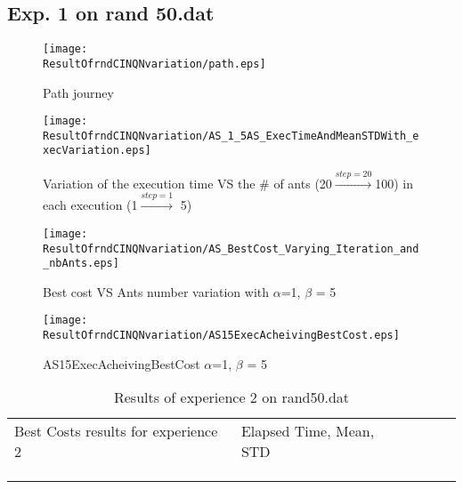 \subsection*{ \centering Exp. 1 on rand 50.dat }
\begin{figure}[H]
	\begin{minipage}[t]{0.5\linewidth}
		\texttt{[image: \\ResultOfrndCINQNvariation/path.eps]}
		\caption{Path journey}
		\label{fig:ResultOfrndCINQNvariation:path}
	\end{minipage}
	\hspace{2mm}
	\begin{minipage}[t]{0.5\linewidth}
	\texttt{[image: \\ResultOfrndCINQNvariation/AS\_1\_5AS\_ExecTimeAndMeanSTDWith\_execVariation.eps]}
	\caption{Variation of the execution time VS the \# of ants (20$\stackrel{step=20}{\rightarrow}$100) in each execution (1$\stackrel{step=1}{\rightarrow}$ 5)}
	\label{fig:ResultOfrndCINQNvariation:AS_1_5AS_ExecTimeAndMeanSTDWith_execVariation}
	\end{minipage}
\end{figure}
\begin{figure}[H]
		\begin{minipage}[t]{.5\linewidth}
		\texttt{[image: \\ResultOfrndCINQNvariation/AS\_BestCost\_Varying\_Iteration\_and\_nbAnts.eps]}
		\caption{Best cost VS Ants number variation with $\alpha$=1, $ \beta $ = 5}
		\label{fig:ResultOfrndCINQNvariation:AS_BestCost_Varying_Iteration_and_nbAnts}
		\end{minipage}
		\begin{minipage}[t]{.5\linewidth}
		\texttt{[image: \\ResultOfrndCINQNvariation/AS15ExecAcheivingBestCost.eps]}
		\caption{AS15ExecAcheivingBestCost $\alpha$=1, $ \beta $ = 5}
		\label{fig:ResultOfrndCINQNvariation:AS15ExecAcheivingBestCost}
		\end{minipage}
\end{figure}
		\begin{minipage}[t]{0.9\linewidth}
		\vspace{-9mm}
		\begin{table}[H]
		\label{tab:ResultOfrndCINQNvariation:expdeux}
		\begin{tabular}{lllll}
		\cline{1-2}
		\multicolumn{1}{|l|}{Best Costs results for experience 2}                                                           &  \multicolumn{1}{l|}{Elapsed Time, Mean, STD}                                             &  &  &  \\ \cline{1-2}
		\multicolumn{1}{|l|}{} & \multicolumn{1}{l|}{ } &  &  &  \\ \cline{1-2}
		& &  &  &  \\
		& &  &  & 
		\end{tabular}
		\caption{Results of experience 2 on rand50.dat}
		\end{table}
		\end{minipage}

